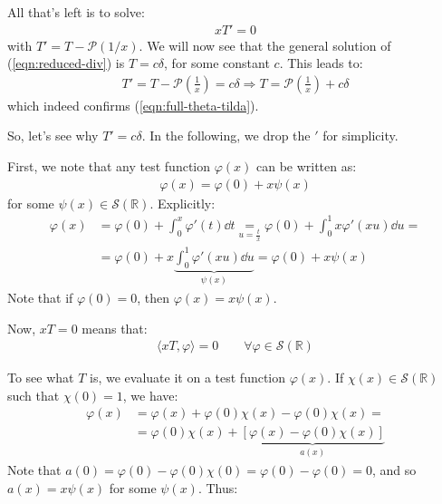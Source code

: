 \documentclass[../template.tex]{subfiles}
\begin{document}
\begin{expl}
    All that's left is to solve:
    \begin{align}
        x T' = 0 \label{eqn:reduced-div}
    \end{align}
    with $T' = T - \mathcal{P}(1/x)$. We will now see that the general solution of (\ref{eqn:reduced-div}) is $T = c \delta$, for some constant $c$. This leads to:
    \begin{align*}
        T' = T - \mathcal{P}\left(\frac{1}{x} \right) = c \delta \Rightarrow T = \mathcal{P}\left(\frac{1}{x} \right) + c \delta
    \end{align*}
    which indeed confirms (\ref{eqn:full-theta-tilda}). 

    \medskip

    So, let's see why $T' = c \delta$. In the following, we drop the $'$ for simplicity.
    
    First, we note that any test function $\varphi(x)$ can be written as:
    \begin{align*}
        \varphi(x) = \varphi(0) + x \psi(x) 
    \end{align*}
    for some $\psi(x) \in \mathcal{S}(\mathbb{R})$. Explicitly:
    \begin{align*}
        \varphi(x) &= \varphi(0) + \int_0^x \varphi'(t) \dd{t} \underset{u = \frac{t}{x} }{=} \varphi(0) + \int_0^1 x \varphi'(xu) \dd{u} =\\
        &= \varphi(0) + x \underbrace{\int_0^1 \varphi'(xu) \dd{u}}_{\psi(x)} = \varphi(0) + x\psi(x)
    \end{align*}
    Note that if $\varphi(0) = 0$, then $\varphi(x) = x \psi(x)$. 

    \medskip

    Now, $x T = 0$ means that:
    \begin{align*}
        \langle x T, \varphi \rangle = 0 \qquad \forall \varphi \in \mathcal{S}(\mathbb{R})
    \end{align*}

    To see what $T$ is, we evaluate it on a test function $\varphi(x)$. If $\chi(x) \in \mathcal{S}(\mathbb{R})$ such that $\chi(0) = 1$, we have:
    \begin{align*}
        \varphi(x) &= \varphi(x) + \varphi(0)\chi(x) - \varphi(0) \chi(x) = \\
        &= \varphi(0)\chi(x) + \underbrace{[\varphi(x) - \varphi(0) \chi(x)]}_{a(x)} 
    \end{align*}
    Note that $a(0) = \varphi(0) - \varphi(0) \chi(0) = \varphi(0) - \varphi(0) = 0$, and so $a(x) = x\psi(x)$ for some $\psi(x)$. Thus:


\end{expl}
\end{document}

